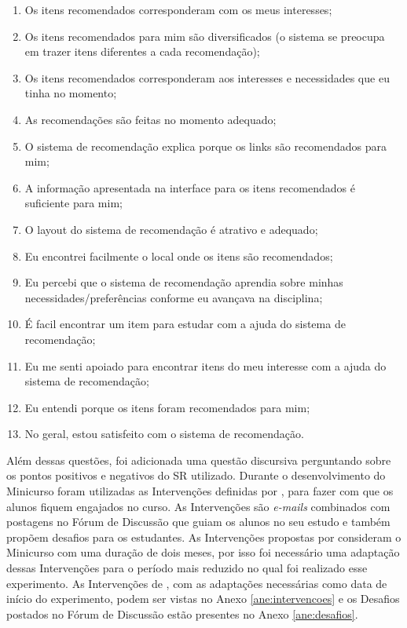 \begin{enumerate}
\item Os itens recomendados corresponderam com os meus interesses;
\item Os itens recomendados para mim são diversificados (o sistema se preocupa em trazer itens diferentes a cada recomendação);
\item Os itens recomendados corresponderam aos  interesses e necessidades que eu tinha no momento;
\item As recomendações são feitas no momento adequado;
\item O sistema de recomendação explica porque os links são recomendados para mim;
\item A informação apresentada na interface para os itens recomendados é suficiente para mim;
\item O layout do sistema de recomendação é atrativo e adequado;
\item Eu encontrei facilmente o local onde os itens são recomendados;
\item Eu percebi que o sistema de recomendação aprendia sobre minhas necessidades/preferências conforme eu avançava na disciplina;
\item É facil encontrar um item para estudar com a ajuda do sistema de recomendação;
\item Eu me senti apoiado para encontrar itens do meu interesse com a ajuda do sistema de recomendação;
\item Eu entendi porque os itens foram recomendados para mim;
\item No geral, estou satisfeito com o sistema de recomendação.
\end{enumerate}

Além dessas questões, foi adicionada uma questão discursiva perguntando sobre os pontos positivos e negativos do SR utilizado.
Durante o desenvolvimento do Minicurso foram utilizadas as Intervenções definidas por , para
fazer com que os alunos fiquem engajados no curso. As Intervenções são \textit{e-mails} combinados com postagens no Fórum de Discussão
que guiam os alunos no seu estudo e também propõem desafios para os estudantes. As Intervenções propostas por 
consideram o Minicurso com uma duração de dois meses, por isso foi necessário uma adaptação dessas Intervenções para o período
mais reduzido no qual foi realizado esse experimento. As Intervenções de , com as adaptações
necessárias como data de início do experimento, podem ser vistas no Anexo \ref{ane:intervencoes} e os Desafios postados
no Fórum de Discussão estão presentes no Anexo \ref{ane:desafios}.

